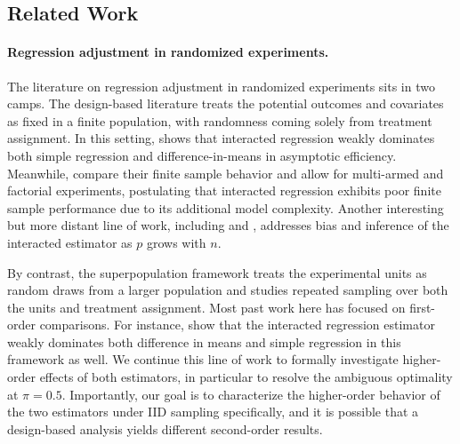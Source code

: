 \documentclass{article}
\theoremstyle{plain}
\theoremstyle{definition}
\theoremstyle{remark}
\begin{document}
\subsection{Related Work}
 
\paragraph{Regression adjustment in randomized experiments.}
The literature on regression adjustment in randomized experiments sits in two camps. The design-based literature treats the potential outcomes and covariates as fixed in a finite population, with randomness coming solely from treatment assignment. In this setting, \citet{Lin2013} shows that interacted regression weakly dominates both simple regression and difference-in-means in asymptotic efficiency. Meanwhile, \citet{zhao2023covariate} compare their finite sample behavior and allow for multi-armed and factorial experiments, postulating that interacted regression exhibits poor finite sample performance due to its additional model complexity. Another interesting but more distant line of work, including \citet{lei2021regression} and \citet{ChiangMatsushitaOtsu2026}, addresses bias and inference of the interacted estimator as $p$ grows with $n$.
 
By contrast, the superpopulation framework treats the experimental units as random draws from a larger population and studies repeated sampling over both the units and treatment assignment. Most past work here has focused on first-order comparisons. For instance, \citet{negi2021revisiting} show that the interacted regression estimator weakly dominates both difference in means and simple regression in this framework as well. We continue this line of work to formally investigate higher-order effects of both estimators, in particular to resolve the ambiguous optimality at $\pi=0.5$. Importantly, our goal is to characterize the higher-order behavior of the two estimators under IID sampling specifically, and it is possible that a design-based analysis yields different second-order results.
 
\end{document}
